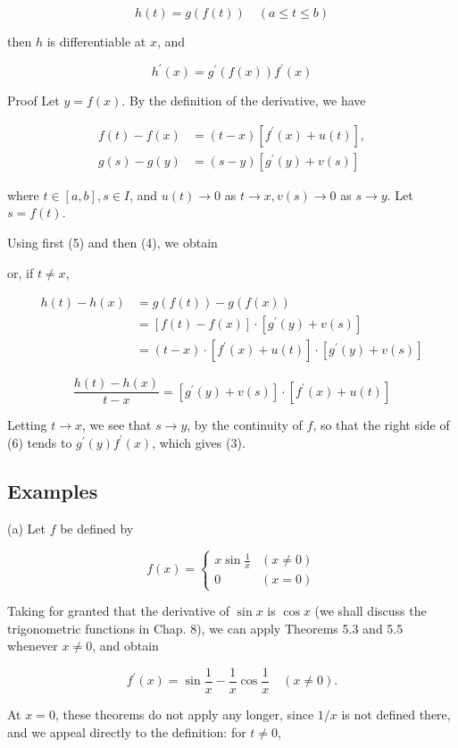 \documentclass[10pt]{article}
\begin{document}
$$
h(t)=g(f(t)) \quad(a \leq t \leq b)
$$

then $h$ is differentiable at $x$, and

$$
h^{\prime}(x)=g^{\prime}(f(x)) f^{\prime}(x)
$$

Proof Let $y=f(x)$. By the definition of the derivative, we have

$$
\begin{aligned}
f(t)-f(x) & =(t-x)\left[f^{\prime}(x)+u(t)\right], \\
g(s)-g(y) & =(s-y)\left[g^{\prime}(y)+v(s)\right]
\end{aligned}
$$

where $t \in[a, b], s \in I$, and $u(t) \rightarrow 0$ as $t \rightarrow x, v(s) \rightarrow 0$ as $s \rightarrow y$. Let $s=f(t)$.

Using first (5) and then (4), we obtain

or, if $t \neq x$,

$$
\begin{aligned}
h(t)-h(x) & =g(f(t))-g(f(x)) \\
& =[f(t)-f(x)] \cdot\left[g^{\prime}(y)+v(s)\right] \\
& =(t-x) \cdot\left[f^{\prime}(x)+u(t)\right] \cdot\left[g^{\prime}(y)+v(s)\right]
\end{aligned}
$$

$$
\frac{h(t)-h(x)}{t-x}=\left[g^{\prime}(y)+v(s)\right] \cdot\left[f^{\prime}(x)+u(t)\right]
$$

Letting $t \rightarrow x$, we see that $s \rightarrow y$, by the continuity of $f$, so that the right side of (6) tends to $g^{\prime}(y) f^{\prime}(x)$, which gives (3).

\subsection{Examples}
(a) Let $f$ be defined by

$$
f(x)= \begin{cases}x \sin \frac{1}{x} & (x \neq 0) \\ 0 & (x=0)\end{cases}
$$

Taking for granted that the derivative of $\sin x$ is $\cos x$ (we shall discuss the trigonometric functions in Chap. 8), we can apply Theorems 5.3 and 5.5 whenever $x \neq 0$, and obtain

$$
f^{\prime}(x)=\sin \frac{1}{x}-\frac{1}{x} \cos \frac{1}{x} \quad(x \neq 0) .
$$

At $x=0$, these theorems do not apply any longer, since $1 / x$ is not defined there, and we appeal directly to the definition: for $t \neq 0$,
\end{document}
